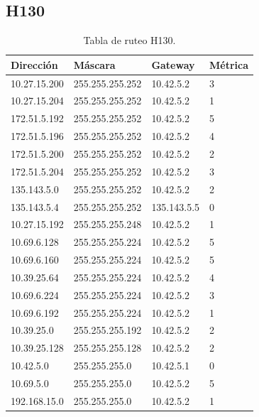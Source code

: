 \documentclass[12pt,titlepage]{article}
\begin{document}
\subsection{H130}
\begin{table}
  \begin{center}
    \begin{tabular}{|l|l|l|l|}
      \hline
        \bf{Direcci\'on} & \bf{M\'ascara} & \bf{Gateway} & \bf{M\'etrica} \\
      \hline 
	10.27.15.200  & 255.255.255.252 & 10.42.5.2 & 3 \\
        10.27.15.204  & 255.255.255.252 & 10.42.5.2 & 1 \\
        172.51.5.192  & 255.255.255.252 & 10.42.5.2 & 5 \\
        172.51.5.196  & 255.255.255.252 & 10.42.5.2 & 4 \\
        172.51.5.200  & 255.255.255.252 & 10.42.5.2 & 2 \\
        172.51.5.204  & 255.255.255.252 & 10.42.5.2 & 3 \\
        135.143.5.0   & 255.255.255.252 & 10.42.5.2 & 2 \\
        135.143.5.4   & 255.255.255.252 & 135.143.5.5 & 0 \\ 	
	10.27.15.192  & 255.255.255.248 & 10.42.5.2 & 1 \\
	10.69.6.128   & 255.255.255.224 & 10.42.5.2 & 5 \\
        10.69.6.160   & 255.255.255.224 & 10.42.5.2 & 5 \\
	10.39.25.64   & 255.255.255.224 & 10.42.5.2 & 4 \\       
	10.69.6.224   & 255.255.255.224 & 10.42.5.2 & 3 \\
	10.69.6.192   & 255.255.255.224 & 10.42.5.2 & 1 \\	
	10.39.25.0    & 255.255.255.192 & 10.42.5.2 & 2 \\
	10.39.25.128  & 255.255.255.128 & 10.42.5.2 & 2 \\
	10.42.5.0     & 255.255.255.0 & 10.42.5.1 & 0 \\
        10.69.5.0     & 255.255.255.0 & 10.42.5.2 & 5 \\
        192.168.15.0  & 255.255.255.0 & 10.42.5.2 & 1 \\  
    \hline
    \end{tabular} \\
  \end{center}
  \caption{Tabla de ruteo H130.}
\end{table}
\FloatBarrier
\end{document}
